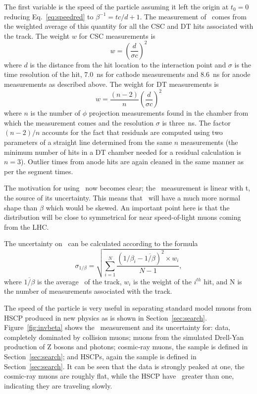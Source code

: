 The first variable is the speed of the particle assuming it left the origin at $t_0 = 0$ reducing Eq.~\ref{eq:speedred} to 
$\beta^{-1} = tc/d + 1$. The measurement of \invbeta\ comes from the weighted average of this quantity for all the
CSC and DT hits associated with the track.
The weight $w$ for CSC measurements is
\begin{equation}
w = \left(\frac{d}{\sigma c}\right)^2
 \label{betaweight}
\end{equation}
where $d$ is the distance from the hit location to the interaction point
and $\sigma$ is the time resolution of the hit, 7.0~ns for cathode measurements and 8.6~ns for anode measurements as described above.
The weight for DT measurements is 
\begin{equation}
 w = \frac{(n-2)}{n}\left(\frac{d}{\sigma c}\right)^2
\end{equation}
where $n$ is the number of $\phi$ projection measurements found in the
chamber from which the measurement comes and the resolution $\sigma$ is three~ns.
The factor $(n-2)/n$ accounts for the fact that residuals are computed
using two parameters of a straight line determined from the same
$n$ measurements (the minimum number of hits in a DT chamber
needed for a residual calculation is $n=3$).
Outlier times from anode hits are again cleaned in the same manner as per the segment times. 

The motivation for using \invbeta\ now becomes clear; the \invbeta\ measurement
is linear with t, the source of its uncertainty. This means that \invbeta\ will have a much more normal shape than $\beta$ which would be skewed.
An important point here is that the distribution will be close to symmetrical for near speed-of-light muons coming from the LHC.

The uncertainty on \invbeta\ can be calculated according to the formula
\begin{equation}
 \sigma_{1/\beta} = \sqrt{\sum_{i=1}^N \frac{(1/\beta_i - \overline{1/\beta})^2 \times w_{i}}{N-1}},
 \label{betaerr}
\end{equation}
where $\overline{1/\beta}$ is the average \invbeta\ of the track, $w_{i}$ is the weight of the $i^{th}$ hit, and N is the number of measurements associated with the track.

The speed of the particle is very useful in separating standard model muons from HSCP produced in new physics as is shown in Section~\ref{sec:search}.
Figure~\ref{fig:invbeta} shows the \invbeta\ measurement and its uncertainty for: data, completely dominated by collision muons; 
muons from the simulated Drell-Yan production of Z bosons and photons; cosmic-ray muons, the sample is defined in Section~\ref{sec:search};
and HSCPs, again the sample is defined in Section~\ref{sec:search}. It can be seen that the data is strongly peaked at one, the cosmic-ray muons are roughly flat, while
the HSCP have \invbeta\ greater than one, indicating they are traveling slowly.

